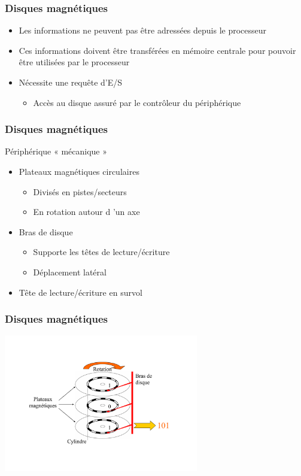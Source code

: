 \begin{frame}
\frametitle{Disques magnétiques}
\begin{itemize}
\item Les informations ne peuvent pas être adressées depuis le processeur
\item Ces informations doivent être transférées en mémoire centrale pour pouvoir être utilisées par le processeur
\item Nécessite une requête d’E/S
\begin{itemize}
\item Accès au disque assuré par le contrôleur du périphérique
\end{itemize}
\end{itemize}
\end{frame}

\begin{frame}
\frametitle{Disques magnétiques}
Périphérique « mécanique »
\begin{itemize}
\item Plateaux magnétiques circulaires
\begin{itemize}
\item Divisés en pistes/secteurs
\item En rotation autour d ’un axe
\end{itemize}
\item Bras de disque
\begin{itemize}
\item Supporte les têtes de lecture/écriture
\item Déplacement latéral
\end{itemize}
\item Tête de lecture/écriture en survol
\end{itemize}
\end{frame}

\begin{frame}
\frametitle{Disques magnétiques}
\includegraphics[height=6cm]{../illustration/decomp_hd.pdf}
\end{frame}

